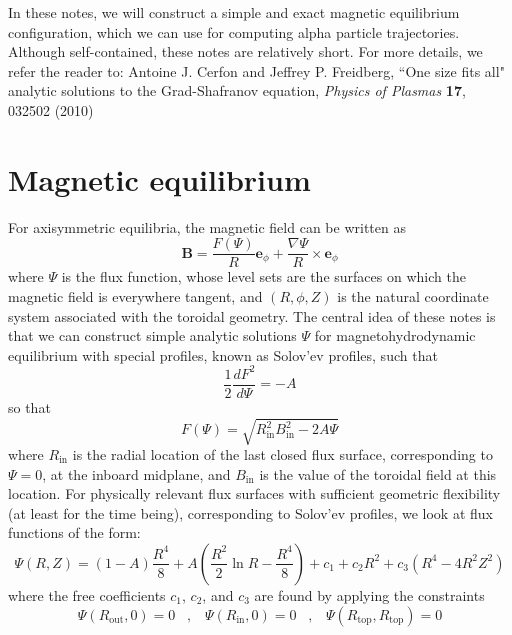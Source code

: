 \documentclass[a4]{article}
\begin{document}
\thispagestyle{fancyplain}

In these notes, we will construct a simple and exact magnetic equilibrium configuration, which we can use for computing alpha particle trajectories. Although self-contained, these notes are relatively short. For more details, we refer the reader to: Antoine J. Cerfon and Jeffrey P. Freidberg, ``One size fits all" analytic solutions to the Grad-Shafranov equation, \textit{Physics of Plasmas} \textbf{17}, 032502 (2010)

\section{Magnetic equilibrium}
For axisymmetric equilibria, the magnetic field can be written as
\begin{equation}
\mathbf{B} = \frac{F(\Psi)}{R}\mathbf{e}_{\phi}+\frac{\nabla\Psi}{R}\times\mathbf{e}_{\phi}
\end{equation}
where $\Psi$ is the flux function, whose level sets are the surfaces on which the magnetic field is everywhere tangent, and $(R,\phi,Z)$ is the natural coordinate system associated with the toroidal geometry. The central idea of these notes is that we can construct simple analytic solutions $\Psi$ for magnetohydrodynamic equilibrium with special profiles, known as Solov'ev profiles, such that
\begin{equation}
\frac{1}{2}\frac{dF^2}{d\Psi}=-A
\end{equation}
so that
\begin{equation}
F(\Psi)=\sqrt{R_{\mathrm{in}}^2 B_{\mathrm{in}}^2-2A\Psi}
\end{equation}
where $R_{\mathrm{in}}$ is the radial location of the last closed flux surface, corresponding to $\Psi = 0$, at the inboard midplane, and $B_{\mathrm{in}}$ is the value of the toroidal field at this location. For physically relevant flux surfaces with sufficient geometric flexibility (at least for the time being), corresponding to Solov'ev profiles, we look at flux functions of the form:
\begin{equation}
\Psi(R,Z)=(1-A)\frac{R^4}{8}+A\left(\frac{R^2}{2}\ln R-\frac{R^4}{8}\right)+c_{1}+c_{2}R^2+c_{3}(R^4-4R^2Z^2)
\end{equation}
where the free coefficients $c_{1}$, $c_{2}$, and $c_{3}$ are found by applying the constraints
\begin{equation}
\Psi(R_{\mathrm{out}},0) = 0\;\;\;,\;\;\;\Psi(R_{\mathrm{in}},0) = 0\;\;\;,\;\;\; \Psi(R_{\mathrm{top}},R_{\mathrm{top}}) = 0\label{eq:constraints}
\end{equation}
\end{document}
